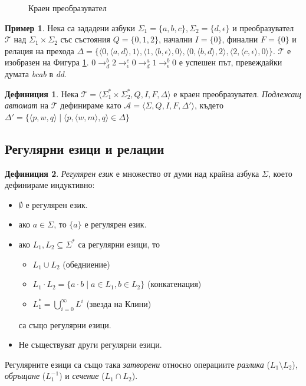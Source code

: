 \documentclass[12pt, oneside]{article}
\theoremstyle{definition}
\newtheorem{definition}{Дефиниция}[section]
\newtheorem{example}{Пример}[section]
\begin{document}
\begin{figure}[!htb]
	\centering
	
	\caption{Краен преобразувател}
	\label{fig:Fst}
\end{figure}

\begin{example}
	Нека са зададени азбуки \( \Sigma_1 = \{ a,b,c \}, \Sigma_2 = \{ d,\epsilon \} \) и преобразувател \( \mathcal{T} \) над \( \Sigma_1 \times \Sigma_2 \) със състояния \( Q = \{ 0, 1, 2 \} \), начални \( I = \{ 0 \} \), финални \( F = \{ 0 \} \) и релация на прехода \( \Delta = \{ \langle 0, \langle a, d \rangle, 1 \rangle, \langle 1, \langle b, \epsilon \rangle, 0 \rangle, \langle 0, \langle b, d \rangle, 2 \rangle, \langle 2, \langle c, \epsilon \rangle, 0 \rangle \} \). \newline
	\( \mathcal{T} \) е изобразен на Фигура \ref{fig:Fst}. \newline
	\( 0 \to^{b}_{d} 2 \to^{c}_{\epsilon} 0 \to^{a}_{d} 1 \to^{b}_{\epsilon} 0 \) е успешен път, превеждайки думата \emph{bcab} в \emph{dd}.
\end{example}

\begin{definition}
	Нека \( \mathcal{T} = \langle \Sigma_1^* \times \Sigma_2^*, Q, I, F, \Delta \rangle \) е краен преобразувател. \emph{Подлежащ автомат} на \( \mathcal{T} \) дефинираме като \( \mathcal{A} = \langle \Sigma, Q, I, F, \Delta' \rangle \), където \( \Delta' = \{ \langle p, w, q \rangle \mid \langle p, \langle w, m \rangle, q \rangle \in \Delta \}\)
\end{definition}

\subsection{Регулярни езици и релации}

\begin{definition} 
	\emph{Регулярен език} е множество от думи над крайна азбука \( \Sigma \), което дефинираме индуктивно:
	\begin{itemize}
		\item \( \emptyset \) е регулярен език.
		\item ако \( a \in \Sigma \), то \( \{ a \} \) е регулярен език.
		\item ако \( L_1, L_2 \subseteq \Sigma^* \) са регулярни езици, то 
		\begin{itemize}
			\item \( L_1 \cup L_2 \) (обедниение)
			\item \( L_1 \cdot L_2 = \{ a \cdot b \mid a \in L_1, b \in L_2 \} \) (конкатенация)
			\item \( L_1^* = \bigcup_{i=0}^{\infty}L^i \) (звезда на Клини)
		\end{itemize}
		 са също регулярни езици.
		\item Не съществуват други регулярни езици.
	\end{itemize}
	Регулярните езици са също така \emph{затворени} относно операциите \emph{разлика} (\( L_1 \setminus L_2 \)), \emph{обръщане} (\( L_1^{-1} \)) и \emph{сечение} (\( L_1 \cap L_2 \)).
\end{definition}
\end{document}
